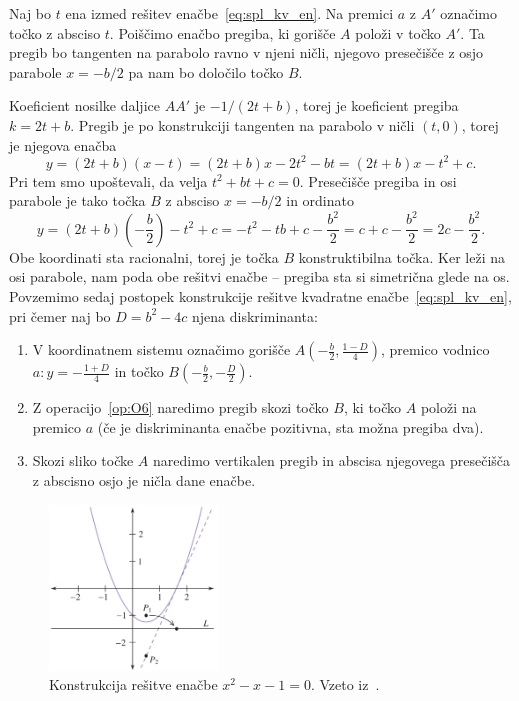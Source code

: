 Naj bo $t$ ena izmed rešitev enačbe~\eqref{eq:spl_kv_en}. Na premici $a$ z $A'$ označimo točko z absciso $t$. Poiščimo enačbo pregiba, ki gorišče $A$ položi v točko $A'$. Ta pregib bo tangenten na parabolo ravno v njeni ničli, njegovo presečišče z osjo parabole $ x = -b/2 $ pa nam bo določilo točko $B$.

Koeficient nosilke daljice $AA'$ je $ - 1/(2t + b)$, torej je koeficient pregiba $k = 2t + b$. Pregib je po konstrukciji tangenten na parabolo v ničli $(t, 0)$, torej je njegova enačba
$$ y = (2t + b)(x - t) = (2t + b)x - 2t^2 - bt = (2t + b)x - t^2 + c. $$
Pri tem smo upoštevali, da velja $t^2 + bt + c = 0$. Presečišče pregiba in osi parabole je tako točka $B$ z absciso $ x = -b/2 $ in ordinato
$$ y = (2t + b)\left(-\frac{b}{2}\right) - t^2 + c = - t^2 - tb + c - \frac{b^2}{2} = c + c - \frac{b^2}{2} = 2c - \frac{b^2}{2}.$$
Obe koordinati sta racionalni, torej je točka $B$ konstruktibilna točka. Ker leži na osi parabole, nam poda obe rešitvi enačbe -- pregiba sta si simetrična glede na os. Povzemimo sedaj postopek konstrukcije rešitve kvadratne enačbe~\eqref{eq:spl_kv_en}, pri čemer naj bo $D = b^2 - 4c$ njena diskriminanta:
\begin{enumerate}
    \item V koordinatnem sistemu označimo gorišče $A\left(-\frac{b}{2}, \frac{1-D}{4}\right)$, premico vodnico $a: y =- \frac{1+D}{4}$ in točko $B(-\frac{b}{2}, -\frac{D}{2})$.
    \item Z operacijo~\ref{op:O6} naredimo pregib skozi točko $B$, ki točko $A$ položi na premico $a$ (če je diskriminanta enačbe pozitivna, sta možna pregiba dva).
    \item Skozi sliko točke $A$ naredimo vertikalen pregib in abscisa njegovega presečišča z abscisno osjo je ničla dane enačbe.
\end{enumerate}

\begin{figure}[h]
    \centering
    \includegraphics[width=0.4\textwidth]{images/kvadratna_enacba/primer_hull.png}
    \caption[Primer reševanja kvadratne enačbe]{Konstrukcija rešitve enačbe $x^2 - x - 1 = 0$. Vzeto iz~\cite[str.\ 37]{hull2020}.}
    \label{fig:par_primer_hull}
\end{figure}

